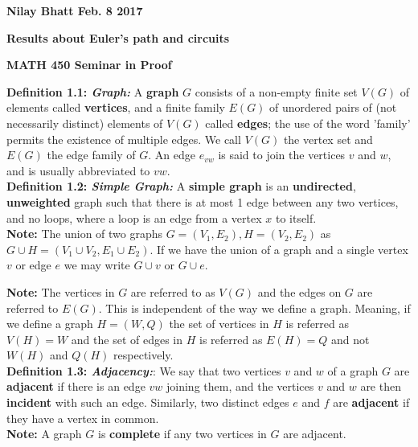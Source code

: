 \documentclass[12pt, fullpage]{article}
\begin{document}
\begin{flushleft}
\textbf{Nilay Bhatt Feb. 8 2017}		
\end{flushleft}
\begin{center}
	\textbf{Results about Euler's path and circuits}
\end{center}
\begin{center}
		
{\bf MATH 450 Seminar in Proof}
 \\
\end{center}
\textbf{Definition 1.1: \textit{Graph: }}A \textbf{graph} $G$ consists of a non-empty finite set $V(G)$ of elements called \textbf{vertices},
and a finite family $E(G)$ of unordered pairs of (not necessarily distinct) elements
of $V(G)$ called \textbf{edges}; the use of the word 'family' permits the existence of multiple edges. We call $V(G)$ the vertex set and $E(G)$ the edge family of $G$. An edge $e_{vw}$ is said to join the vertices $v$ and $w$, and is usually abbreviated to $vw$. \\

\textbf{Definition 1.2: \textit{Simple Graph:}} A \textbf{simple graph} is an \textbf{undirected}, \textbf{unweighted} graph such that there is at most 1 edge between any two vertices, and no loops, where a loop is an edge from a vertex $x$ to itself.\\ \textbf{Note:} The union of two graphs $G = (V_1,E_2),H = (V_2,E_2)$ as $G\cup H = (V_1\cup V_2, E_1 \cup E_2)$. If we have the union of a graph and a single vertex $v$ or edge $e$ we may write $G\cup v$ or $G\cup e$.\newline

\textbf{Note:}	The vertices in $G$ are referred to as $V(G)$ and the edges on $G$ are referred to $E(G)$. This is independent of the way we define a graph. Meaning, if we define a graph $H = (W,Q)$ the set of vertices in $H$ is referred as $V(H) = W$ and the set of edges in $H$ is referred as $E(H) = Q$ and not $W(H)$ and  $Q(H)$ respectively.\\

\textbf{Definition 1.3: \textit{Adjacency:}}: We say that two vertices $v$ and $w$ of a graph $G$ are \textbf{adjacent} if there is an edge $vw$ joining
them, and the vertices $v$ and $w$ are then \textbf{incident} with such an edge. Similarly, two
distinct edges $e$ and $f$ are \textbf{adjacent} if they have a vertex in common.\\

\textbf{Note:} A graph $G$ is \textbf{complete} if any two vertices in $G$ are adjacent.\\
\end{document}
